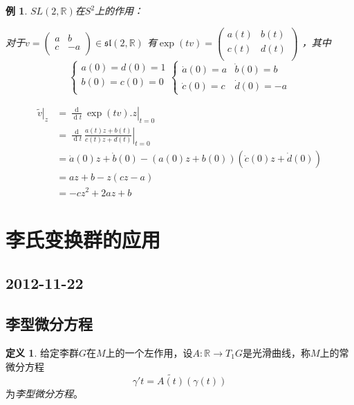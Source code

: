 \documentclass[winfonts,UTF8,c5size,a4paper,fancyhdr,hyperref,titlepage,nocap]{ctexart}
\newtheorem{exa}[thm]{例}
\theoremstyle{definition}
\newtheorem{defn}[thm]{定义}
\theoremstyle{remark}
\numberwithin{equation}{subsection}
\newcommand{\Real}{\mathbb{R}}
\newcommand{\red}{\color{red}}
\newcommand{\dt}{\frac{\operatorname{d}}{\operatorname{d}t}}
\newcommand{\local}[2]{\left.{#1}\right|_{#2}}%
\newcommand{\localt}[1]{\local{#1}{t=0}}%
\begin{document}
\begin{exa}
  $SL(2,\Real)$在$S^2$上的作用：

对于$v=\begin{pmatrix}
  a & b \\
  c & -a \\
\end{pmatrix}\in \mathfrak{sl}(2,\Real)$
有$
\exp(tv)=\begin{pmatrix}
  a(t) & b(t) \\
  c(t) & d(t) \\
\end{pmatrix}$
，其中
\begin{equation*}
\begin{cases}
a(0)=d(0)=1\\
b(0)=c(0)=0\\
\end{cases}
\begin{cases}
\dot{a}(0)=a&
\dot{b}(0)=b\\
\dot{c}(0)=c&
\dot{d}(0)=-a
\end{cases}
\end{equation*}

\begin{align*}
\local{\widetilde{v}}{z}&=\localt{\dt\exp(tv).z}\\
                        &=\localt{\dt\frac{a(t)z+b(t)}{c(t)z+d(t)}}\\
                        &=\dot{a}(0)z+\dot{b}(0)-(a(0)z+b(0))(\dot{c}(0)z+\dot{d}(0))\\
                        &=az+b-z(cz-a)\\
                        &=-cz^2+2az+b
\end{align*}
\end{exa}

\section{李氏变换群的应用}
\subsection*{2012-11-22}
\subsection{李型微分方程}
\begin{defn}
  给定李群$G$在$M$上的一个左作用，设$A\colon\Real\to T_1G$是光滑曲线，称$M$上的常微分方程
  \begin{equation*}
  \gamma'{t}=\widetilde{A(t)}(\gamma(t))
  \end{equation*}
  为\emph{\red 李型微分方程}。
\end{defn}
\end{document}
